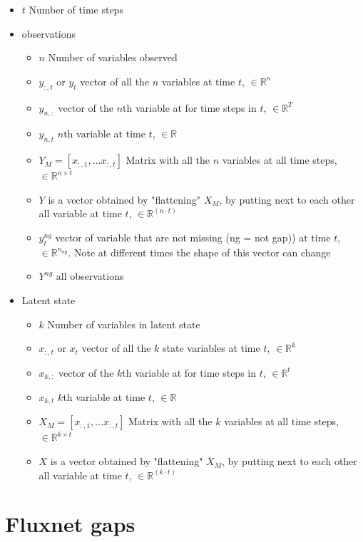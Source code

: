 \documentclass{article}
\let\Oldsection\section
\renewcommand{\section}{\FloatBarrier\Oldsection}
\begin{document}
\begin{itemize}
\item $t$  Number of time steps
\item observations
\begin{itemize}
    \item $n$  Number of variables observed
    \item $y_{:,t}$ or $y_t$ vector of all the $n$ variables at time $t$, $\in \mathbb{R}^n $
    \item $y_{n,:}$ vector of the $n$th variable at for time steps in $t$, $\in \mathbb{R}^T$
    \item $y_{n,t}$ $n$th variable at time $t$, $\in \mathbb{R}$ 
    \item $Y_M = [x_{:,1}, ... x_{:, t}]$ Matrix with all the $n$ variables at all time steps, $\in \mathbb{R}^{n \times t}$ 
    \item $Y$ is a vector obtained by "flattening" $X_M$, by putting next to each other all variable at time $t$, $\in \mathbb{R}^{(n \cdot t)}$
    \item $y^{ng}_t$ vector of variable that are not missing (ng = not gap)) at time $t$, $\in \mathbb{R}^{n_{ng}}$. Note at different times the shape of this vector can change
    \item $Y^{ng}$ all observations
\end{itemize}

\item Latent state
\begin{itemize}
    \item $k$  Number of variables in latent state
    \item $x_{:,t}$ or $x_t$ vector of all the $k$ state variables at time $t$, $\in \mathbb{R}^k $
    \item $x_{k,:}$ vector of the $k$th variable at for time steps in $t$, $\in \mathbb{R}^t$
    \item $x_{k,t}$ $k$th variable at time $t$, $\in \mathbb{R}$ 
    \item $X_M = [x_{:,1}, ... x_{:, t}]$ Matrix with all the $k$ variables at all time steps, $\in \mathbb{R}^{k \times t}$ 
    \item $X$ is a vector obtained by "flattening" $X_M$, by putting next to each other all variable at time $t$, $\in \mathbb{R}^{(k \cdot t)}$
\end{itemize}

\end{itemize}

\section{Fluxnet gaps}
\end{document}
